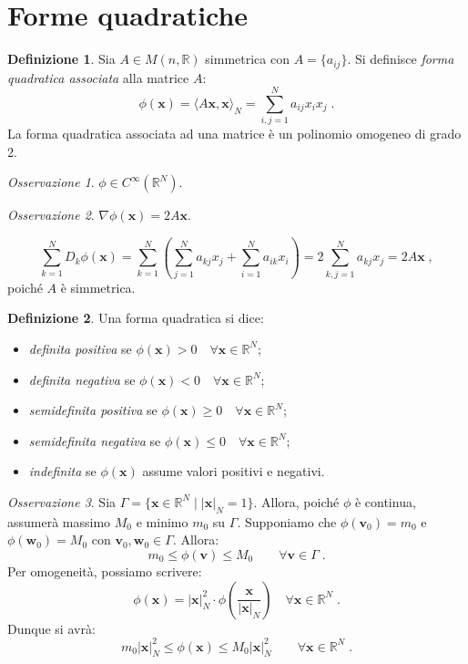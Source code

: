 \documentclass[a4paper,12pt]{report}
\theoremstyle{plain}
\theoremstyle{definition}
\newtheorem{defn}{Definizione}[section]
\theoremstyle{remark}
\newtheorem{oss}{Osservazione}[section]
\numberwithin{equation}{section}
\begin{document}
\section{Forme quadratiche}
\begin{defn} Sia $A \in M(n,\mathbb{R})$ simmetrica con $A=\{a_{ij}\}$. Si definisce \textit{forma quadratica associata} alla matrice $A$:
\begin{equation}
\phi(\mathbf{x})=\langle A\mathbf{x},\mathbf{x}\rangle_N = \sum_{i,j=1}^N a_{ij}x_ix_j\;.
\end{equation}
La forma quadratica associata ad una matrice è un polinomio omogeneo di grado 2.
\end{defn}
\begin{oss} $\phi \in C^{\infty}(\mathbb{R}^N)$.
\end{oss}
\begin{oss} $\nabla \phi(\mathbf{x})=2A\mathbf{x}$.
\end{oss}
\proof 
\begin{equation}
\sum_{k=1}^N D_k\phi(\mathbf{x})=\sum_{k=1}^N \left( \sum_{j=1}^N a_{kj}x_j+\sum_{i=1}^N a_{ik}x_i\right)=2\sum_{k,j=1}^Na_{kj}x_j=2A\mathbf{x}\;,
\end{equation}
poiché $A$ è simmetrica.
\endproof
\begin{defn} Una forma quadratica si dice:
\begin{itemize}
 \item \textit{definita positiva} se $\phi(\mathbf{x})>0 \quad \forall \mathbf{x} \in \mathbb{R}^N$;
 \item \textit{definita negativa} se $\phi(\mathbf{x})<0 \quad \forall \mathbf{x} \in \mathbb{R}^N$;
 \item \textit{semidefinita positiva} se $\phi(\mathbf{x})\ge0 \quad \forall \mathbf{x} \in \mathbb{R}^N$;
 \item \textit{semidefinita negativa} se $\phi(\mathbf{x})\le0 \quad \forall \mathbf{x} \in \mathbb{R}^N$;
 \item \textit{indefinita} se $\phi(\mathbf{x})$ assume valori positivi e negativi.
\end{itemize}
\end{defn}
\begin{oss} Sia $\Gamma=\{\mathbf{x}\in \mathbb{R}^N\;|\;|\mathbf{x}|_N=1\}$. Allora, poiché $\phi$ è continua, assumerà massimo $M_0$ e minimo $m_0$ su $\Gamma$. Supponiamo che $\phi(\mathbf{v}_0)=m_0$ e $\phi(\mathbf{w}_0)=M_0$ con $\mathbf{v}_0,\mathbf{w}_0 \in \Gamma$. Allora:
\begin{equation}
m_0 \le \phi(\mathbf{v}) \le M_0 \qquad \forall \mathbf{v} \in \Gamma\;.
\end{equation}
Per omogeneità, possiamo scrivere:
\begin{equation}
\phi(\mathbf{x})=|\mathbf{x}|_N^2 \cdot \phi\left(\frac{\mathbf{x}}{|\mathbf{x}|_N}\right) \quad \forall \mathbf{x} \in \mathbb{R}^N\;.
\end{equation}
Dunque si avrà:
\begin{equation}
m_0|\mathbf{x}|_N^2 \le \phi(\mathbf{x}) \le M_0|\mathbf{x}|_N^2 \qquad \forall \mathbf{x} \in \mathbb{R}^N\;.
\end{equation}
\end{oss}
\end{document}
